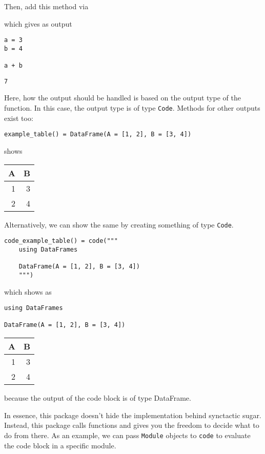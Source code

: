 \documentclass[
  14pt
  american,
  paper=a4,
  ,captions=tableheading
]{scrreprt}
\newcommand{\passthrough}[1]{#1}
\begin{document}
Then, add this method via

which gives as output

\begin{lstlisting}
a = 3
b = 4

a + b
\end{lstlisting}

\begin{lstlisting}
7
\end{lstlisting}

Here, how the output should be handled is based on the output type of
the function. In this case, the output type is of type
\passthrough{\lstinline!Code!}. Methods for other outputs exist too:

\begin{lstlisting}
example_table() = DataFrame(A = [1, 2], B = [3, 4])
\end{lstlisting}

shows

\begin{longtable}[]{@{}rr@{}}
\toprule
A & B\tabularnewline
\midrule
\endhead
1 & 3\tabularnewline
2 & 4\tabularnewline
\bottomrule
\end{longtable}

Alternatively, we can show the same by creating something of type
\passthrough{\lstinline!Code!}.

\begin{lstlisting}
code_example_table() = code("""
    using DataFrames

    DataFrame(A = [1, 2], B = [3, 4])
    """)
\end{lstlisting}

which shows as

\begin{lstlisting}
using DataFrames

DataFrame(A = [1, 2], B = [3, 4])
\end{lstlisting}

\begin{longtable}[]{@{}rr@{}}
\toprule
A & B\tabularnewline
\midrule
\endhead
1 & 3\tabularnewline
2 & 4\tabularnewline
\bottomrule
\end{longtable}

because the output of the code block is of type DataFrame.

In essence, this package doesn't hide the implementation behind
synctactic sugar. Instead, this package calls functions and gives you
the freedom to decide what to do from there. As an example, we can pass
\passthrough{\lstinline!Module!} objects to
\passthrough{\lstinline!code!} to evaluate the code block in a specific
module.
\end{document}
